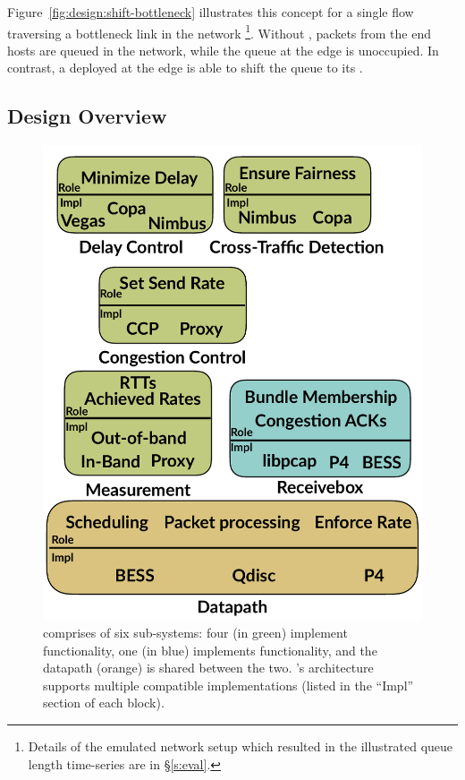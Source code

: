 Figure~\ref{fig:design:shift-bottleneck} illustrates this concept for a single flow traversing a bottleneck link in the network
\footnote{Details of the emulated network setup which resulted in the illustrated queue length time-series are in \S\ref{s:eval}.}.
Without \name, packets from the end hosts are queued in the network, while the queue at the edge is unoccupied. 
In contrast, a \name deployed at the edge is able to shift the queue to its \inbox.

\subsection{Design Overview}\label{s:design:overview}
\begin{figure}
    \centering
    \includegraphics[width=\columnwidth]{img/arch-block-diag}
    \caption{\name comprises of six sub-systems: four (in green) implement \inbox functionality, one (in blue) implements \outbox functionality, and the datapath (orange) is shared between the two. \name's architecture supports multiple compatible implementations (listed in the ``Impl'' section of each block).}\label{fig:design:block-diag}
\end{figure}
